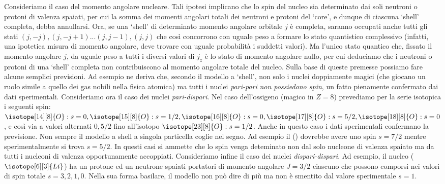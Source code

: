 Consideriamo il caso del momento
angolare nucleare. Tali ipotesi implicano
che lo spin del nucleo sia determinato dai
soli neutroni o protoni di valenza spaiati,
per cui la somma dei momenti angolari
totali dei neutroni e protoni del ‘core’, e
dunque di ciascuna ‘shell’ completa,
debba annullarsi.
Ora, se una ‘shell’ di determinato
momento angolare orbitale $j$ è
completa, saranno occupati anche tutti
gli stati $(j,-j), (j,-j+1)...(j,j-1), (j,j)$ che così
concorrono con uguale peso a formare lo
stato quantistico complessivo (infatti, una
ipotetica misura di momento angolare,
deve trovare con uguale probabilità i
suddetti valori). Ma l’unico stato quantico
che, fissato il momento angolare $j$, da
uguale peso a tutti i diversi valori di $j_{z}$ è lo
stato di momento angolare nullo, per cui
deduciamo che i neutroni o protoni di una
‘shell’ completa non contribuiscono al
momento angolare totale del nucleo.
Sulla base di queste premesse possiamo fare alcune semplici previsioni.
Ad esempio ne deriva che, secondo il modello a ‘shell’, non solo i nuclei doppiamente magici (che giocano un ruolo simile a quello dei gas nobili nella fisica atomica) ma tutti i nuclei \emph{pari-pari} \emph{non possiedono spin}, un fatto pienamente confermato dai dati sperimentali.
Consideriamo ora il caso dei nuclei \emph{pari-dispari}.
Nel caso dell’ossigeno (magico in $Z=8$) prevediamo per la serie isotopica i seguenti spin: $\isotope[14][8]{O}: s= 0,
\isotope[15][8]{O}: s= 1/2, \isotope[16][8]{O}: s= 0, \isotope[17][8]{O}: s= 5/2, \isotope[18][8]{O}: s= 0$, e così via a valori
alternati $0, 5/2$ fino all’isotopo $\isotope[23][8]{O}: s= 1/2$.
Anche in questo caso i dati sperimentali confermano la previsione.
Non sempre il modello a shell a singola particella coglie nel segno. Ad
esempio il () dovrebbe avere uno spin $s=7/2$ mentre sperimentalmente
si trova $s=5/2$. In questi casi si ammette che lo spin venga deteminato non
dal solo nucleone di valenza spaiato ma da tutti i nucleoni di valenza
opportunamente accoppiati.
Consideriamo infine il caso dei nuclei \emph{dispari-dispari}. Ad esempio, il nucleo
($\isotope[6][3]{Li}$) ha un protone ed un neutrone spaiati portatori di momento angolare
$J=3/2$ ciascuno che possono comporsi nei valori di spin totale $s=3,2,1,0$.
Nella sua forma basilare, il modello non può dire di più ma non è smentito dal valore sperimentale $s=1$.
\bigskip

